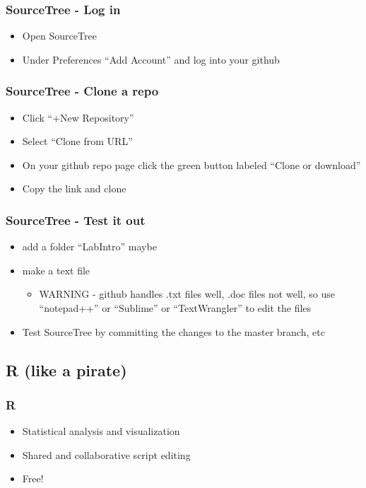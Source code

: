 \documentclass[14pt]{beamer}
\begin{document}
\begin{frame}
\frametitle{SourceTree - Log in}
\begin{itemize}
	\item Open SourceTree
	\item Under Preferences ``Add Account'' and log into your github
\end{itemize}
\end{frame}

\begin{frame}
\frametitle{SourceTree - Clone a repo}
\begin{itemize}
	\item Click ``+New Repository''
	\item Select ``Clone from URL''
	\item On your github repo page click the green button labeled ``Clone or download''
	\item Copy the link and clone
\end{itemize}
\end{frame}

\begin{frame}
\frametitle{SourceTree - Test it out}
\begin{itemize}
	\item add a folder ``LabIntro'' maybe
	\item make a text file
	\begin{itemize}
		\item WARNING - github handles .txt files well, .doc files not well, so use ``notepad++'' or ``Sublime'' or ``TextWrangler'' to edit the files
	\end{itemize}
	\item Test SourceTree by committing the changes to the master branch, etc
\end{itemize}
\end{frame}

\subsection{R (like a pirate)}

\begin{frame}
\frametitle{R}
\begin{itemize}
	\item Statistical analysis and visualization
	\item Shared and collaborative script editing
	\item Free!
\end{itemize}
\end{frame}
\end{document}

